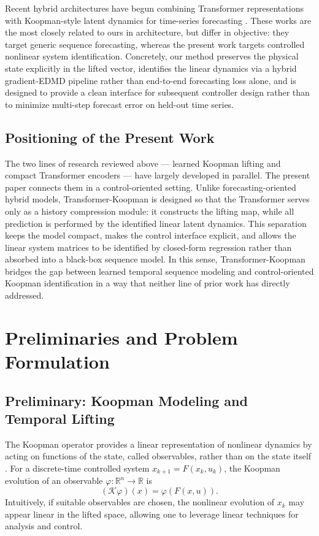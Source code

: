 \documentclass[journal]{IEEEtran}
\begin{document}
Recent hybrid architectures have begun combining Transformer representations with Koopman-style latent dynamics for time-series forecasting \cite{forootani2026deepkoopformer, forootani2026spectral}. These works are the most closely related to ours in architecture, but differ in objective: they target generic sequence forecasting, whereas the present work targets controlled nonlinear system identification. Concretely, our method preserves the physical state explicitly in the lifted vector, identifies the linear dynamics via a hybrid gradient-EDMD pipeline rather than end-to-end forecasting loss alone, and is designed to provide a clean interface for subsequent controller design rather than to minimize multi-step forecast error on held-out time series.

\subsection{Positioning of the Present Work}

The two lines of research reviewed above — learned Koopman lifting and compact Transformer encoders — have largely developed in parallel. The present paper connects them in a control-oriented setting. Unlike forecasting-oriented hybrid models, Transformer-Koopman is designed so that the Transformer serves only as a history compression module: it constructs the lifting map, while all prediction is performed by the identified linear latent dynamics. This separation keeps the model compact, makes the control interface explicit, and allows the linear system matrices to be identified by closed-form regression rather than absorbed into a black-box sequence model. In this sense, Transformer-Koopman bridges the gap between learned temporal sequence modeling and control-oriented Koopman identification in a way that neither line of prior work has directly addressed.

\section{Preliminaries and Problem Formulation}

\subsection{Preliminary: Koopman Modeling and Temporal Lifting}
\label{sec:preliminary}

The Koopman operator provides a linear representation of nonlinear dynamics by acting on functions of the state, called observables, rather than on the state itself \cite{koopman1931hamiltonian, mezic2005spectral, rowley2009spectral, brunton2022modern}. For a discrete-time controlled system $x_{k+1} = F(x_k,u_k)$, the Koopman evolution of an observable $\varphi:\mathbb{R}^n\to\mathbb{R}$ is
\begin{equation}
    (\mathcal{K}\varphi)(x) = \varphi(F(x,u)).
    \label{eq:koopman_operator}
\end{equation}
Intuitively, if suitable observables are chosen, the nonlinear evolution of $x_k$ may appear linear in the lifted space, allowing one to leverage linear techniques for analysis and control.
\end{document}
